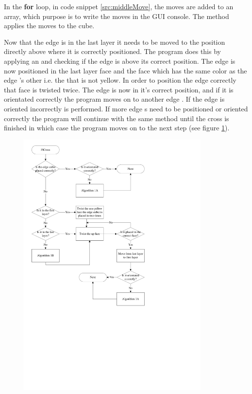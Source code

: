 In the \textbf{for} loop, in code snippet \ref{src:middleMove}, the moves are added to an array, which purpose is to write the moves in the GUI console. 
The  method applies the moves to the cube.


Now that the edge \cpiece{} is in the last layer it needs to be moved to the position directly above where it is correctly positioned. 
The program does this by applying an  \twist{} and checking if the edge \cpiece{} is above its correct position.
The edge \cpiece{} is now positioned in the last layer face and the face which has the same color as the edge  \cpiece{}'s other \facelet{} i.e. the \facelet{} that is not yellow.
In order to position the edge \cpiece{} correctly that face is twisted twice.
The edge \cpiece{} is now in it's correct position, and if it is orientated correctly the program moves on to another edge \cpiece{} .
If the edge \cpiece{} is oriented incorrectly  is performed. If more edge \cpiece{}s need to be positioned or oriented correctly the program will continue with the same method until the cross is finished in which case the program moves on to the next step (see figure \ref{fig:FlCrossFlow}).
\vspace{-3mm}
\begin{figure}[hp]
	\centering
		\includegraphics[width = 0.86\textwidth, trim = 0mm 100mm 65mm 7mm, clip]{input/pics/FlCrossFlow.pdf}
	\caption{}
	\label{fig:FlCrossFlow}
\end{figure}

